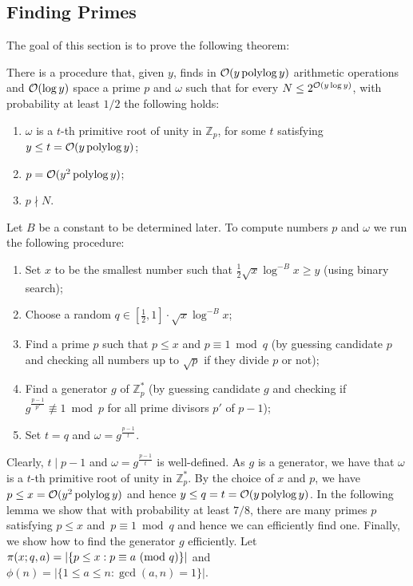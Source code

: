 \subsection{Finding Primes}\label{se:finding_primes}

The goal of this section is to prove the following theorem:

\begin{thm}\label{thm:good_p_and_omega}
There is a procedure that, given $y$, finds in $\mathcal{O}(y\operatorname{polylog} y)$ arithmetic operations and $\mathcal{O}(\log y)$ space a prime $p$ and $\omega$ such that for every $N\leq 2^{\mathcal{O}(y\log y)}$, with probability at least $1/2$ the following holds:
\begin{enumerate}
\item $\omega$ is a $t$-th primitive root of unity in $\mathbb{Z}_{p}$, for some $t$ satisfying $y\leq  t = \mathcal{O}(y\operatorname{polylog} y)$;\label{root}
\item $p = \mathcal{O}( y^2\operatorname{polylog} y)$;\label{und}
\item $p \nmid N$.\label{notzero}
\end{enumerate}
\end{thm}
 
\noindent
Let $B$ be a constant to be determined later.
To compute numbers $p$ and $\omega$ we run the following procedure:
\begin{enumerate}
 \item Set $x$ to be the smallest number such that $\frac 12 \sqrt x \log^{-B}x \geq y$ (using binary search);
 \item Choose a random $q\in [\frac12,1]\cdot \sqrt{x}\log^{-B} x$;
 \item Find a prime $p$ such that $p \leq x$ and  $p \equiv 1 \bmod q$ (by guessing candidate $p$ and checking all numbers up to $\sqrt{p}$ if they divide $p$ or not); \item Find a generator $g$ of $\mathbb{Z}^{*}_{p}$ (by guessing candidate $g$ and checking if $g^{\frac{p-1}{p'}} \not\equiv 1 \bmod p$ for all prime divisors $p'$ of $p-1$);
 \item Set $t=q$  and $\omega=g^{\frac{p-1}{t}}$.
\end{enumerate}

Clearly, $t \mid p-1$ and $\omega=g^{\frac{p-1}{t}}$ is well-defined. As $g$ is a  generator, we have that $\omega$ is a $t$-th primitive root of unity in $\mathbb{Z}^{*}_{p}$.
By the choice of $x$ and $p$, we have $p \leq x = \mathcal{O}(y^2\operatorname{polylog} y)$ and hence $y\leq  q = t = \mathcal{O}(y\operatorname{polylog} y)$.
In the following lemma we show that with probability at least $7/8$, there are many primes $p$ satisfying $p \leq x$ and~$p \equiv 1 \bmod q$ and hence we can efficiently find one.
Finally, we show how to find the generator $g$ efficiently.
Let $\pi(x;q,a) = |\{p\leq x : p \equiv a \ (\mathrm{mod}\ q)\}|$ and $\phi(n)=|\{1\leq a \leq n: \gcd(a,n)=1\}|$.

